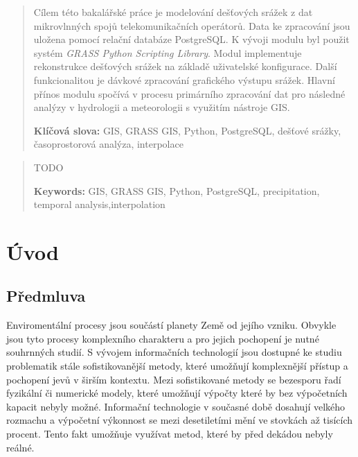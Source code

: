 \documentclass[a4paper,12pt,oneside]{report}
\author{Matěj Krejčí}
\newcommand{\klicslova}[2]{\noindent\textbf{#1: }#2}
\newcommand{\necislovana}[1]{%
\phantomsection
\addcontentsline{toc}{section}{#1}
\section*{#1}
\markboth{\uppercase{#1}}{}
}
\begin{document}
\pagestyle{empty}
\renewcommand\footnotelayout{\footnotesize}

\newpage


\begin{abstract}
Cílem této bakalářské práce je modelování dešťových srážek z dat mikrovlnných spojů telekomunikačních operátorů. Data ke zpracování jsou uložena pomocí relační databáze PostgreSQL.
K vývoji modulu byl použit systém \textit{GRASS Python Scripting Library}. Modul implementuje rekonstrukce dešťových srážek na základě uživatelské konfigurace. Další funkcionalitou je dávkové zpracování grafického výstupu srážek. Hlavní přínos modulu spočívá v procesu primárního zpracování dat pro následné analýzy v hydrologii a meteorologii s využitím nástroje GIS.
\bigskip

\klicslova{Klíčová slova}{GIS, GRASS GIS, Python, PostgreSQL, dešťové srážky, časoprostorová analýza, interpolace}

\end{abstract}

\begin{abstract}
TODO 
\bigskip

\klicslova{Keywords}{GIS, GRASS GIS, Python, PostgreSQL, precipitation, temporal analysis,interpolation}

\end{abstract}


\newpage

\newpage

\tableofcontents


\newpage
\necislovana{Úvod}

\pagestyle{fancy}

\setcounter{page}{1}
\subsection*{Předmluva}
Enviromentální procesy jsou součástí planety Země od jejího vzniku. Obvykle jsou tyto procesy komplexního charakteru a pro jejich pochopení je nutné souhrnných  studií. S vývojem informačních technologií jsou dostupné ke studiu problematik stále sofistikovanější metody, které umožňují komplexnější přístup a pochopení jevů v širším kontextu. Mezi sofistikované metody se bezesporu řadí fyzikální či numerické modely, které umožňují výpočty které by bez výpočetních kapacit nebyly možné. Informační technologie v současné době dosahují velkého rozmachu a výpočetní výkonnost se mezi desetiletími mění ve stovkách až tisících procent. Tento fakt umožňuje využívat metod, které by před dekádou nebyly reálné.
\end{document}
